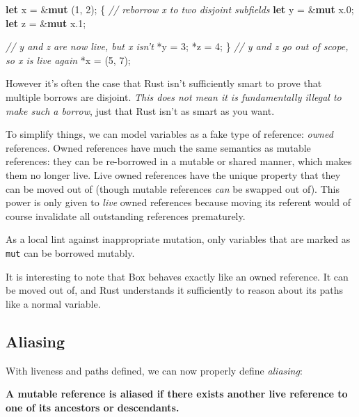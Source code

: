 \documentclass[a4paper,]{book}
\newenvironment{Shaded}{\begin{snugshade}}{\end{snugshade}}
\newcommand{\KeywordTok}[1]{\textcolor[rgb]{0.13,0.29,0.53}{\textbf{{#1}}}}
\newcommand{\DecValTok}[1]{\textcolor[rgb]{0.00,0.00,0.81}{{#1}}}
\newcommand{\CommentTok}[1]{\textcolor[rgb]{0.56,0.35,0.01}{\textit{{#1}}}}
\newcommand{\NormalTok}[1]{{#1}}
\begin{document}
\begin{Shaded}
\begin{Highlighting}[]
\KeywordTok{let} \NormalTok{x = &}\KeywordTok{mut} \NormalTok{(}\DecValTok{1}\NormalTok{, }\DecValTok{2}\NormalTok{);}
\NormalTok{\{}
    \CommentTok{// reborrow x to two disjoint subfields}
    \KeywordTok{let} \NormalTok{y = &}\KeywordTok{mut} \NormalTok{x.}\DecValTok{0}\NormalTok{;}
    \KeywordTok{let} \NormalTok{z = &}\KeywordTok{mut} \NormalTok{x.}\DecValTok{1}\NormalTok{;}

    \CommentTok{// y and z are now live, but x isn't}
    \NormalTok{*y = }\DecValTok{3}\NormalTok{;}
    \NormalTok{*z = }\DecValTok{4}\NormalTok{;}
\NormalTok{\}}
\CommentTok{// y and z go out of scope, so x is live again}
\NormalTok{*x = (}\DecValTok{5}\NormalTok{, }\DecValTok{7}\NormalTok{);}
\end{Highlighting}
\end{Shaded}

However it's often the case that Rust isn't sufficiently smart to prove
that multiple borrows are disjoint. \emph{This does not mean it is
fundamentally illegal to make such a borrow}, just that Rust isn't as
smart as you want.

To simplify things, we can model variables as a fake type of reference:
\emph{owned} references. Owned references have much the same semantics
as mutable references: they can be re-borrowed in a mutable or shared
manner, which makes them no longer live. Live owned references have the
unique property that they can be moved out of (though mutable references
\emph{can} be swapped out of). This power is only given to \emph{live}
owned references because moving its referent would of course invalidate
all outstanding references prematurely.

As a local lint against inappropriate mutation, only variables that are
marked as \texttt{mut} can be borrowed mutably.

It is interesting to note that Box behaves exactly like an owned
reference. It can be moved out of, and Rust understands it sufficiently
to reason about its paths like a normal variable.

\subsection{Aliasing}\label{aliasing}

With liveness and paths defined, we can now properly define
\emph{aliasing}:

\textbf{A mutable reference is aliased if there exists another live
reference to one of its ancestors or descendants.}
\end{document}
